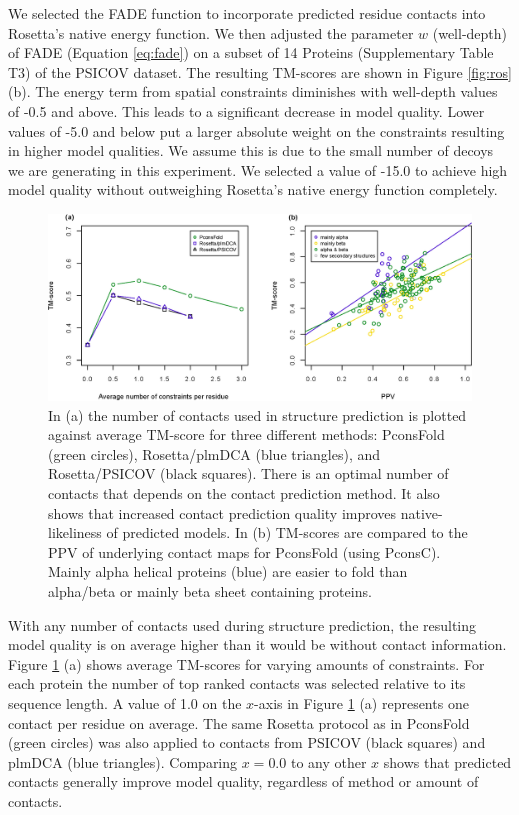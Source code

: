 \documentclass{bioinfo}
\begin{document}
We selected the FADE function to incorporate predicted residue contacts into Rosetta's native energy function. We then adjusted the parameter $w$ (well-depth) of FADE (Equation \ref{eq:fade}) on a subset of 14 Proteins (Supplementary Table T3) of the PSICOV dataset. The resulting TM-scores are shown in Figure \ref{fig:ros} (b). The energy term from spatial constraints diminishes with well-depth values of -0.5 and above. This leads to a significant decrease in model quality. Lower values of -5.0 and below put a larger absolute weight on the constraints resulting in higher model qualities. We assume this is due to the small number of decoys we are generating in this experiment. We selected a value of -15.0 to achieve high model quality without outweighing Rosetta's native energy function completely.\\\indent
\begin{figure}[!tpb]%
\centerline{\includegraphics[scale=0.7]{figures/tmscores.eps}}
\caption{In (a) the number of contacts used in structure prediction is plotted against average TM-score for three different methods: PconsFold (green circles), Rosetta/plmDCA (blue triangles), and Rosetta/PSICOV (black squares). There is an optimal number of contacts that depends on the contact prediction method. It also shows that increased contact prediction quality improves native-likeliness of predicted models. In (b) TM-scores are compared to the PPV of underlying contact maps for PconsFold (using PconsC). Mainly alpha helical proteins (blue) are easier to fold than alpha/beta or mainly beta sheet containing proteins.}\label{fig:main}
\end{figure}
With any number of contacts used during structure prediction, the resulting model quality is on average higher than it would be without contact information. Figure \ref{fig:main} (a) shows average TM-scores for varying amounts of constraints. For each protein the number of top ranked contacts was selected relative to its sequence length. A value of 1.0 on the $x$-axis in Figure \ref{fig:main} (a) represents one contact per residue on average. The same Rosetta protocol as in PconsFold (green circles) was also applied to contacts from PSICOV (black squares) and plmDCA (blue triangles). Comparing $x=0.0$ to any other $x$ shows that predicted contacts generally improve model quality, regardless of method or amount of contacts. \\\indent
\end{document}
